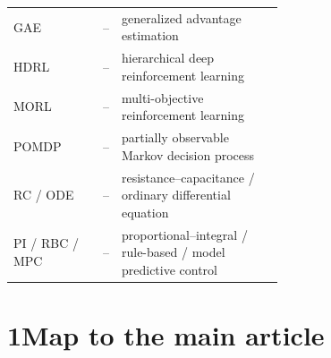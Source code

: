 \documentclass[11pt,a4paper]{article}
\renewcommand{\thetable}{S\arabic{table}}
\begin{document}
\begin{longtable}{@{}l l p{0.60\linewidth}@{}}
GAE & -- & generalized advantage estimation \\
HDRL & -- & hierarchical deep reinforcement learning \\
MORL & -- & multi-objective reinforcement learning \\
POMDP & -- & partially observable Markov decision process \\
RC / ODE & -- & resistance--capacitance / ordinary differential equation \\
PI / RBC / MPC & -- & proportional--integral / rule-based / model predictive control \\
\bottomrule
\end{longtable}
\renewcommand{\thetable}{S\arabic{table}}
\setcounter{table}{0}

\section*{1\quad Map to the main article}
\end{document}
